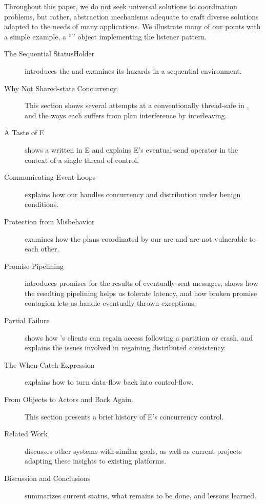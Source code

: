 \documentclass{llncs}
\begin{document}
Throughout this paper, we do not seek universal solutions to coordination
problems, but rather, abstraction mechanisms adequate to craft diverse
solutions adapted to the needs of many applications. We illustrate
many of our points with a simple example, a ``''
object implementing the listener pattern.
%
\begin{description}
\item[The Sequential StatusHolder] introduces the 
and examines its hazards in a sequential environment.

\item[Why Not Shared-state Concurrency.] This section shows several
attempts at a conventionally thread-safe  in
, and the ways each suffers from plan interference by
interleaving.

\item[A Taste of E] shows a  written in E and explains
E's eventual-send operator in the context of a single thread of
control.

\item[Communicating Event-Loops] explains how our 
handles concurrency and distribution under benign conditions.

\item[Protection from Misbehavior] examines how the plans coordinated
by our  are and are not vulnerable to each other.

\item[Promise Pipelining] introduces promises for the results of
eventually-sent messages, shows how the resulting pipelining helps us
tolerate latency, and how broken promise contagion lets us handle
eventually-thrown exceptions.

\item[Partial Failure] shows how 's clients can
regain access following a partition or crash, and explains the issues
involved in regaining distributed consistency.

\item[The When-Catch Expression] explains how to turn data-flow back
into control-flow.

\item[From Objects to Actors and Back Again.] This section presents a
brief history of E's concurrency control.

\item[Related Work] discusses other systems with similar goals, as
well as current projects adapting these insights to existing
platforms.

\item[Discussion and Conclusions] summarizes current status, what
remains to be done, and lessons learned.

\end{description}
\end{document}
